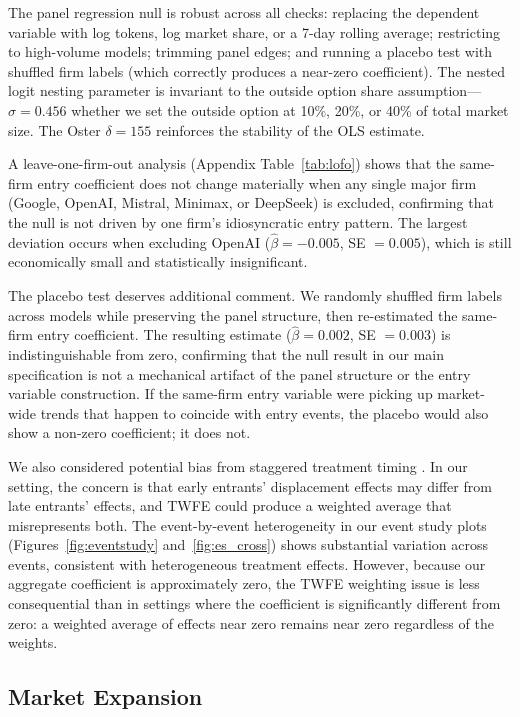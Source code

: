 \documentclass[11pt, a4paper]{article}
\begin{document}
The panel regression null is robust across all checks: replacing the dependent variable with log tokens, log market share, or a 7-day rolling average; restricting to high-volume models; trimming panel edges; and running a placebo test with shuffled firm labels (which correctly produces a near-zero coefficient). The nested logit nesting parameter is invariant to the outside option share assumption---$\hat{\sigma} = 0.456$ whether we set the outside option at 10\%, 20\%, or 40\% of total market size. The Oster $\delta = 155$ reinforces the stability of the OLS estimate.

A leave-one-firm-out analysis (Appendix Table~\ref{tab:lofo}) shows that the same-firm entry coefficient does not change materially when any single major firm (Google, OpenAI, Mistral, Minimax, or DeepSeek) is excluded, confirming that the null is not driven by one firm's idiosyncratic entry pattern. The largest deviation occurs when excluding OpenAI ($\hat{\beta} = -0.005$, SE $= 0.005$), which is still economically small and statistically insignificant.

The placebo test deserves additional comment. We randomly shuffled firm labels across models while preserving the panel structure, then re-estimated the same-firm entry coefficient. The resulting estimate ($\hat{\beta} = 0.002$, SE $= 0.003$) is indistinguishable from zero, confirming that the null result in our main specification is not a mechanical artifact of the panel structure or the entry variable construction. If the same-firm entry variable were picking up market-wide trends that happen to coincide with entry events, the placebo would also show a non-zero coefficient; it does not.

We also considered potential bias from staggered treatment timing \citep{dechaisemartin2020twoway, goodmanbacon2021}. In our setting, the concern is that early entrants' displacement effects may differ from late entrants' effects, and TWFE could produce a weighted average that misrepresents both. The event-by-event heterogeneity in our event study plots (Figures~\ref{fig:eventstudy} and~\ref{fig:es_cross}) shows substantial variation across events, consistent with heterogeneous treatment effects. However, because our aggregate coefficient is approximately zero, the TWFE weighting issue is less consequential than in settings where the coefficient is significantly different from zero: a weighted average of effects near zero remains near zero regardless of the weights.

\subsection{Market Expansion}
\end{document}
